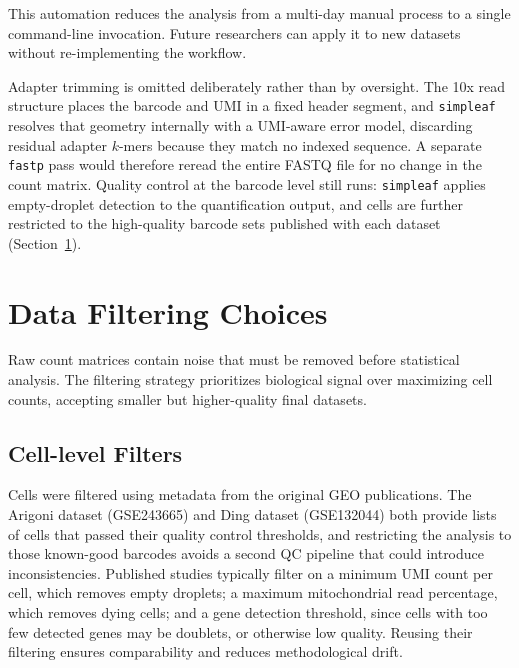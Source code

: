 This automation reduces the analysis from a multi-day manual process to a single command-line invocation. Future researchers can apply it to new datasets without re-implementing the workflow.

Adapter trimming is omitted deliberately rather than by oversight. The 10x read structure places the barcode and UMI in a fixed header segment, and \texttt{simpleaf} resolves that geometry internally with a UMI-aware error model, discarding residual adapter $k$-mers because they match no indexed sequence. A separate \texttt{fastp} pass would therefore reread the entire FASTQ file for no change in the count matrix. Quality control at the barcode level still runs: \texttt{simpleaf} applies empty-droplet detection to the quantification output, and cells are further restricted to the high-quality barcode sets published with each dataset (Section~\ref{sec:data-filtering}).

\section{Data Filtering Choices}\label{sec:data-filtering}

Raw count matrices contain noise that must be removed before statistical analysis. The filtering strategy prioritizes biological signal over maximizing cell counts, accepting smaller but higher-quality final datasets.

\subsection*{Cell-level Filters}

Cells were filtered using metadata from the original GEO publications. The Arigoni dataset (GSE243665\cite{arigoni2024benchmark}) and Ding dataset (GSE132044\cite{ding2020systematic}) both provide lists of cells that passed their quality control thresholds, and restricting the analysis to those known-good barcodes avoids a second QC pipeline that could introduce inconsistencies. Published studies typically filter on a minimum UMI count per cell, which removes empty droplets; a maximum mitochondrial read percentage, which removes dying cells; and a gene detection threshold, since cells with too few detected genes may be doublets, or otherwise low quality. Reusing their filtering ensures comparability and reduces methodological drift.

